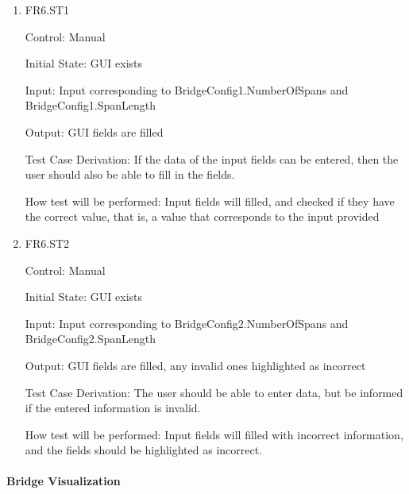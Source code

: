 \documentclass[12pt, titlepage]{article}
\begin{document}
\begin{enumerate}

  \item{FR6.ST1\\}

  Control: Manual
  
  Initial State: GUI exists
  
  Input: Input corresponding to BridgeConfig1.NumberOfSpans and BridgeConfig1.SpanLength
  
  Output: GUI fields are filled
  
  Test Case Derivation: If the data of the input fields can be entered, then the user
  should also be able to fill in the fields.
  
  How test will be performed: Input fields will filled, and checked if they have the
  correct value, that is, a value that corresponds to the input provided
  
  \item{FR6.ST2\\}
  
  Control: Manual
  
  Initial State: GUI exists
  
  Input: Input corresponding to BridgeConfig2.NumberOfSpans and BridgeConfig2.SpanLength
  
  Output: GUI fields are filled, any invalid ones highlighted as incorrect
  
  Test Case Derivation: The user should be able to enter data, but be informed if the
  entered information is invalid.
  
  How test will be performed: Input fields will filled with incorrect information, 
  and the fields should be highlighted as incorrect.

\end{enumerate}

\paragraph{Bridge Visualization}
\end{document}
